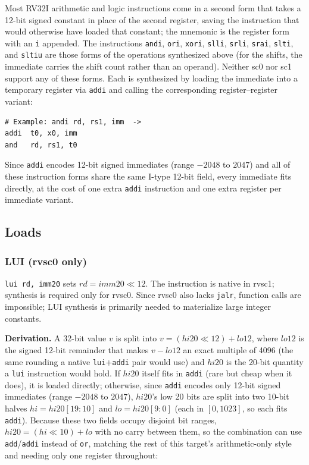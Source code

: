 Most RV32I arithmetic and logic instructions come in a second form that takes a 12-bit signed
constant in place of the second register, saving the instruction that would otherwise have loaded
that constant; the mnemonic is the register form with an \texttt{i} appended. The instructions
\texttt{andi}, \texttt{ori}, \texttt{xori}, \texttt{slli}, \texttt{srli},
\texttt{srai}, \texttt{slti}, and \texttt{sltiu} are those forms of the operations synthesized
above (for the shifts, the immediate carries the shift count rather than an operand). Neither sc0 nor sc1 support any of these forms. Each is synthesized by loading the
immediate into a temporary register via \texttt{addi} and calling the corresponding
register--register variant:

\begin{lstlisting}
# Example: andi rd, rs1, imm  ->
addi  t0, x0, imm
and   rd, rs1, t0
\end{lstlisting}

Since \texttt{addi} encodes 12-bit signed immediates (range $-2048$ to $2047$) and all of these
instruction forms share the same I-type 12-bit field, every immediate fits directly, at the cost of
one extra \texttt{addi} instruction and one extra register per immediate variant.

\subsection{Loads} \label{sec:sc1-loads}

\subsubsection{LUI (rvsc0 only)} \label{sec:sc0-lui}

\texttt{lui rd, imm20} sets $\mathit{rd} = \mathit{imm20} \ll 12$. The instruction is native in
rvsc1; synthesis is required only for rvsc0. Since rvsc0 also lacks \texttt{jalr}, function calls
are impossible; LUI synthesis is primarily needed to materialize large integer constants.

\textbf{Derivation.} A 32-bit value $v$ is split into $v = (\mathit{hi20} \ll 12) + \mathit{lo12}$,
where $\mathit{lo12}$ is the signed 12-bit remainder that makes $v - \mathit{lo12}$ an exact multiple
of 4096 (the same rounding a native \texttt{lui}+\texttt{addi} pair would use) and $\mathit{hi20}$ is
the 20-bit quantity a \texttt{lui} instruction would hold. If $\mathit{hi20}$ itself fits in
\texttt{addi} (rare but cheap when it does), it is loaded directly; otherwise, since \texttt{addi}
encodes only 12-bit signed immediates (range $-2048$ to $2047$), $\mathit{hi20}$'s low 20 bits are
split into two 10-bit halves $\mathit{hi} = \mathit{hi20}[19{:}10]$ and $\mathit{lo} =
\mathit{hi20}[9{:}0]$ (each in $[0, 1023]$, so each fits \texttt{addi}). Because these two fields
occupy disjoint bit ranges, $\mathit{hi20} = (\mathit{hi} \ll 10) + \mathit{lo}$ with no carry
between them, so the combination can use \texttt{add}/\texttt{addi} instead of \texttt{or},
matching the rest of this target's arithmetic-only style and needing only one register throughout:

